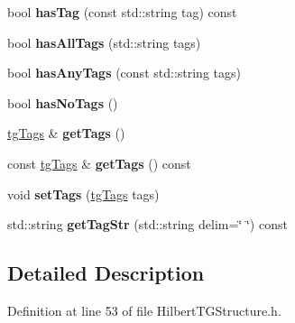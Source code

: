 \begin{DoxyCompactItemize}
\item 
\hypertarget{classtg_taggable_ae31f65869c8887bfeb34a344902c4d5b}{bool {\bfseries has\-Tag} (const std\-::string tag) const }\label{classtg_taggable_ae31f65869c8887bfeb34a344902c4d5b}

\item 
\hypertarget{classtg_taggable_a33b77b1075171b63f673965687b2e844}{bool {\bfseries has\-All\-Tags} (std\-::string tags)}\label{classtg_taggable_a33b77b1075171b63f673965687b2e844}

\item 
\hypertarget{classtg_taggable_af14af28fa98021c4f20a5e8f2ddd5606}{bool {\bfseries has\-Any\-Tags} (const std\-::string tags)}\label{classtg_taggable_af14af28fa98021c4f20a5e8f2ddd5606}

\item 
\hypertarget{classtg_taggable_adff345e116e16420c701a748ff8f995f}{bool {\bfseries has\-No\-Tags} ()}\label{classtg_taggable_adff345e116e16420c701a748ff8f995f}

\item 
\hypertarget{classtg_taggable_acf1d7fa9df8f374f25015c4080902681}{\hyperlink{classtg_tags}{tg\-Tags} \& {\bfseries get\-Tags} ()}\label{classtg_taggable_acf1d7fa9df8f374f25015c4080902681}

\item 
\hypertarget{classtg_taggable_ae70d7d3b45301665bc363b0ed8b9b292}{const \hyperlink{classtg_tags}{tg\-Tags} \& {\bfseries get\-Tags} () const }\label{classtg_taggable_ae70d7d3b45301665bc363b0ed8b9b292}

\item 
\hypertarget{classtg_taggable_a5492888e4e4da4cca6261070b5726adf}{void {\bfseries set\-Tags} (\hyperlink{classtg_tags}{tg\-Tags} tags)}\label{classtg_taggable_a5492888e4e4da4cca6261070b5726adf}

\item 
\hypertarget{classtg_taggable_a346d66b066d2d9eb1eadba01da43749f}{std\-::string {\bfseries get\-Tag\-Str} (std\-::string delim=\char`\"{} \char`\"{}) const }\label{classtg_taggable_a346d66b066d2d9eb1eadba01da43749f}

\end{DoxyCompactItemize}


\subsection{Detailed Description}


Definition at line 53 of file Hilbert\-T\-G\-Structure.\-h.



